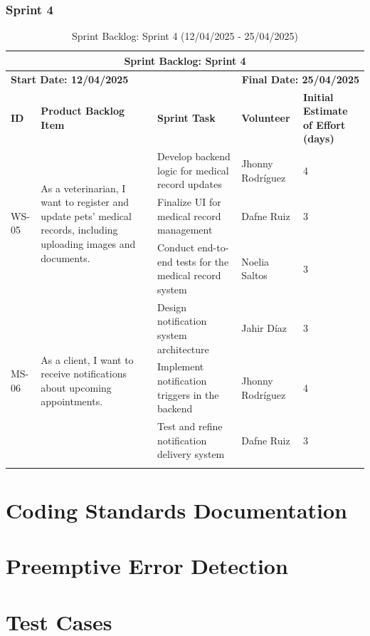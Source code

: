 \documentclass[a4paper,12pt]{report}
\begin{document}
	\subsection{Sprint 4}
	\begin{longtable}{|p{2cm}|p{4cm}|p{5cm}|p{3cm}|p{2cm}|} 
		\hline
		\multicolumn{5}{|c|}{\textbf{Sprint Backlog: Sprint 4}} \\
		\hline
		\multicolumn{2}{|l|}{\textbf{Start Date: 12/04/2025}} & \multicolumn{3}{r|}{\textbf{Final Date: 25/04/2025}} \\
		\hline
		\textbf{ID} & \textbf{Product Backlog Item} & \textbf{Sprint Task} & \textbf{Volunteer} & \textbf{Initial Estimate of Effort (days)} \\
		\hline
		\multirow{3}{*}{WS-05} 
		& \multirow{3}{4cm}{As a veterinarian, I want to register and update pets' medical records, including uploading images and documents.}
		& Develop backend logic for medical record updates & Jhonny Rodríguez & 4 \\
		\cline{3-5}
		& & Finalize UI for medical record management & Dafne Ruiz & 3 \\
		\cline{3-5}
		& & Conduct end-to-end tests for the medical record system & Noelia Saltos & 3 \\
		\hline
		\multirow{3}{*}{MS-06} 
		& \multirow{3}{4cm}{As a client, I want to receive notifications about upcoming appointments.}
		& Design notification system architecture & Jahir Díaz & 3 \\
		\cline{3-5}
		& & Implement notification triggers in the backend & Jhonny Rodríguez & 4 \\
		\cline{3-5}
		& & Test and refine notification delivery system & Dafne Ruiz & 3 \\
		\hline
		\caption{Sprint Backlog: Sprint 4 (12/04/2025 - 25/04/2025)}
	\end{longtable}
	
	
	\clearpage


	\chapter{Coding Standards Documentation}
	
	\chapter{Preemptive Error Detection}
	\chapter{Test Cases}
	
\end{document}
